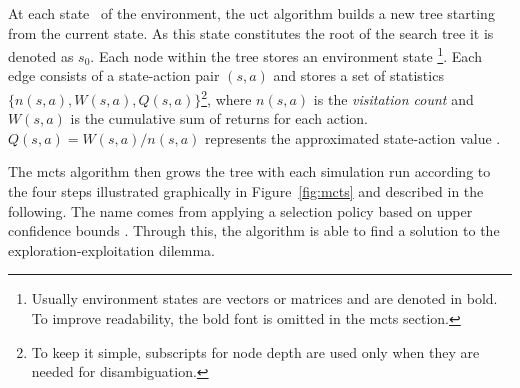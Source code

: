 At each state \state\ of the environment, the \gls{uct} algorithm builds a new tree starting from the current state. As this state constitutes the root of the search tree it is denoted as $s_0$. Each node within the tree stores an environment state \state \footnote{Usually environment states are vectors or matrices and are denoted in bold. To improve readability, the bold font is omitted in the \gls{mcts} section.}. Each edge consists of a state-action pair $(s, a)$ and stores a set of statistics $\{n(s, a), W(s, a), Q(s, a) \}$\footnote{To keep it simple, subscripts for node depth are used only when they are needed for disambiguation.}, where $n(s, a)$ is the \emph{visitation count} and $W(s, a)$ is the cumulative sum of returns for each action. $Q(s, a) = W(s, a)/n(s, a)$ represents the approximated state-action value \cite{moerlandA0CAlphaZero2018}.

The \gls{mcts} algorithm then grows the tree with each simulation run according to the four steps illustrated graphically in Figure~\ref{fig:mcts} and described in the following. The name  comes from applying a selection policy based on upper confidence bounds \cite{kocsisBanditBasedMonteCarlo2006, kocsisImprovedMonteCarloSearch}. Through this, the algorithm is able to find a solution to the exploration-exploitation dilemma.

